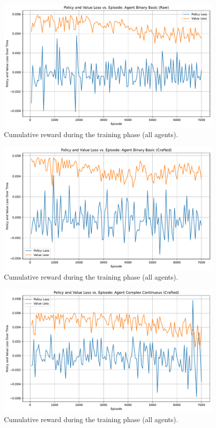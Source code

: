 \documentclass[sigconf]{acmart}
\begin{document}
\begin{figure}[t]
  \centering
  \includegraphics[width=\textwidth]{policy_value_loss_Binary Basic (Raw).pdf}
  \caption{Cumulative reward during the training phase (all agents).}
  \label{fig:policy_value_loss_Binary Basic (Raw)}
\end{figure}

\begin{figure}[t]
  \centering
  \includegraphics[width=\textwidth]{policy_value_loss_Binary Basic (Crafted).pdf}
  \caption{Cumulative reward during the training phase (all agents).}
  \label{fig:policy_value_loss_Binary Basic (Crafted)}
\end{figure}


\begin{figure}[t]
  \centering
  \includegraphics[width=\textwidth]{policy_value_loss_Complex Continuous (Crafted).pdf}
  \caption{Cumulative reward during the training phase (all agents).}
  \label{fig:policy_value_loss_Complex Continuous (Crafted)}
\end{figure}
\end{document}

